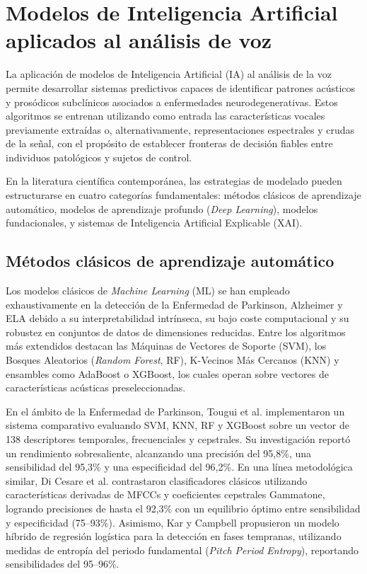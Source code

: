 \section{Modelos de Inteligencia Artificial aplicados al análisis de voz}\label{sec:modelos_ia_voz}

La aplicación de modelos de Inteligencia Artificial (IA) al análisis de la voz permite desarrollar sistemas predictivos capaces de identificar patrones acústicos y prosódicos subclínicos asociados a enfermedades neurodegenerativas. Estos algoritmos se entrenan utilizando como entrada las características vocales previamente extraídas o, alternativamente, representaciones espectrales y crudas de la señal, con el propósito de establecer fronteras de decisión fiables entre individuos patológicos y sujetos de control.

En la literatura científica contemporánea, las estrategias de modelado pueden estructurarse en cuatro categorías fundamentales: métodos clásicos de aprendizaje automático, modelos de aprendizaje profundo (\textit{Deep Learning}), modelos fundacionales, y sistemas de Inteligencia Artificial Explicable (XAI).

\subsection{Métodos clásicos de aprendizaje automático}

Los modelos clásicos de \textit{Machine Learning} (ML) se han empleado exhaustivamente en la detección de la Enfermedad de Parkinson, Alzheimer y ELA debido a su interpretabilidad intrínseca, su bajo coste computacional y su robustez en conjuntos de datos de dimensiones reducidas. Entre los algoritmos más extendidos destacan las Máquinas de Vectores de Soporte (SVM), los Bosques Aleatorios (\textit{Random Forest}, RF), K-Vecinos Más Cercanos (KNN) y ensambles como AdaBoost o XGBoost, los cuales operan sobre vectores de características acústicas preseleccionadas.

En el ámbito de la Enfermedad de Parkinson, Tougui et al. \cite{tougui2020} implementaron un sistema comparativo evaluando SVM, KNN, RF y XGBoost sobre un vector de 138 descriptores temporales, frecuenciales y cepstrales. Su investigación reportó un rendimiento sobresaliente, alcanzando una precisión del 95,8\%, una sensibilidad del 95,3\% y una especificidad del 96,2\%. En una línea metodológica similar, Di Cesare et al. \cite{dicesare2024} contrastaron clasificadores clásicos utilizando características derivadas de MFCCs y coeficientes cepstrales Gammatone, logrando precisiones de hasta el 92,3\% con un equilibrio óptimo entre sensibilidad y especificidad (75--93\%). Asimismo, Kar y Campbell \cite{kar2020} propusieron un modelo híbrido de regresión logística para la detección en fases tempranas, utilizando medidas de entropía del periodo fundamental (\textit{Pitch Period Entropy}), reportando sensibilidades del 95--96\%.

